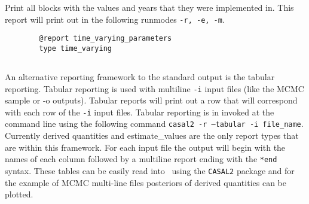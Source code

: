 Print all  blocks with the values and years that they were implemented in. This report will print out in the following runmodes \texttt{-r, -e, -m}.

{\small{\begin{verbatim}
		@report time_varying_parameters
		type time_varying
		\end{verbatim}}}

\subsection{}
An alternative reporting framework to the standard output is the tabular reporting. Tabular reporting is used with multiline \texttt{-i} input files (like the MCMC sample or -o outputs). Tabular reports will print out a row that will correspond with each row of the \texttt{-i} input files. Tabular reporting is in invoked at the command line using the following command \texttt{casal2 -r --tabular -i file\_name}. Currently derived quantities and estimate\_values are the only report types that are within this framework. For each input file the output will begin with the names of each column followed by a multiline report ending with the \texttt{*end} syntax. These tables can be easily read into \R\ using the \texttt{CASAL2} package and for the example of MCMC multi-line files posteriors of derived quantities can be plotted.


